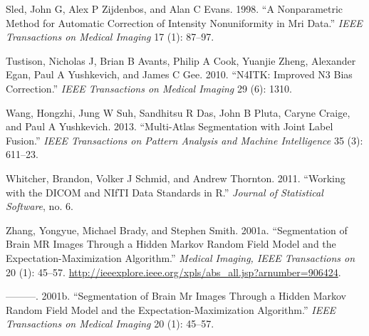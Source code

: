 \documentclass[]{elsarticle} %
\begin{document}
\leavevmode\hypertarget{ref-sled1998nonparametric}{}%
Sled, John G, Alex P Zijdenbos, and Alan C Evans. 1998. ``A Nonparametric Method for Automatic Correction of Intensity Nonuniformity in Mri Data.'' \emph{IEEE Transactions on Medical Imaging} 17 (1): 87--97.

\leavevmode\hypertarget{ref-n4}{}%
Tustison, Nicholas J, Brian B Avants, Philip A Cook, Yuanjie Zheng, Alexander Egan, Paul A Yushkevich, and James C Gee. 2010. ``N4ITK: Improved N3 Bias Correction.'' \emph{IEEE Transactions on Medical Imaging} 29 (6): 1310.

\leavevmode\hypertarget{ref-malf}{}%
Wang, Hongzhi, Jung W Suh, Sandhitsu R Das, John B Pluta, Caryne Craige, and Paul A Yushkevich. 2013. ``Multi-Atlas Segmentation with Joint Label Fusion.'' \emph{IEEE Transactions on Pattern Analysis and Machine Intelligence} 35 (3): 611--23.

\leavevmode\hypertarget{ref-orodicom}{}%
Whitcher, Brandon, Volker J Schmid, and Andrew Thornton. 2011. ``Working with the DICOM and NIfTI Data Standards in R.'' \emph{Journal of Statistical Software}, no. 6.

\leavevmode\hypertarget{ref-zhang_segmentation_2001}{}%
Zhang, Yongyue, Michael Brady, and Stephen Smith. 2001a. ``Segmentation of Brain MR Images Through a Hidden Markov Random Field Model and the Expectation-Maximization Algorithm.'' \emph{Medical Imaging, IEEE Transactions on} 20 (1): 45--57. \url{http://ieeexplore.ieee.org/xpls/abs_all.jsp?arnumber=906424}.

\leavevmode\hypertarget{ref-zhang2001segmentation}{}%
---------. 2001b. ``Segmentation of Brain Mr Images Through a Hidden Markov Random Field Model and the Expectation-Maximization Algorithm.'' \emph{IEEE Transactions on Medical Imaging} 20 (1): 45--57.
\end{document}
